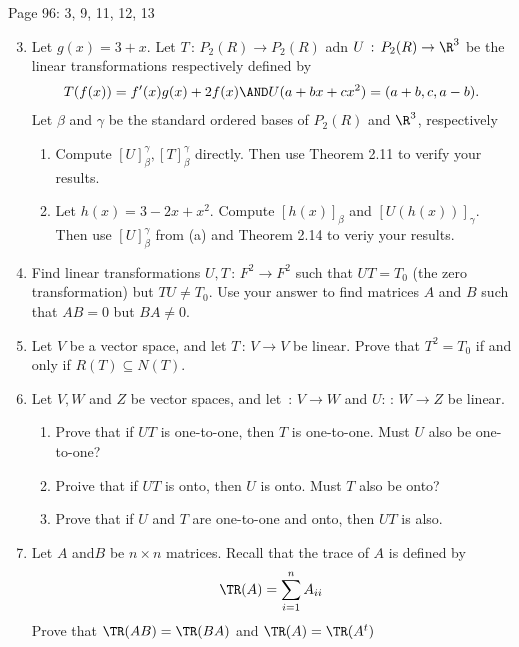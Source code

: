 \documentclass[10pt,a4paper]{report}
\begin{document}
\newpage
Page 96: 3, 9, 11, 12, 13
\begin{enumerate}
	\setcounter{enumi}{2}
	\item Let $g(x)=3+x$.  Let $T\,:\, P_2(R)\to P_2(R)$ adn $U\,:\, P_2(R) \to \R^3$ be the linear transformations respectively defined by 
	\begin{align*}
	T(f(x)) = f'(x)g(x)+2f(x)\AND U(a+bx+cx^2)=(a+b,c,a-b).
	\end{align*}Let $\beta$ and $\gamma$ be the standard ordered bases of $P_2(R)$ and $\R^3$, respectively
	\begin{enumerate}
		\item Compute $[U]_\beta^\gamma, [T]_\beta^\gamma$ directly.  Then use Theorem 2.11 to verify your results.
		\item Let $h(x) =3-2x+x^2$.  Compute $[h(x)]_\beta$ and $[U(h(x))]_\gamma$.  Then use $[U]_\beta^\gamma$ from (a) and Theorem 2.14 to veriy your results.
	\end{enumerate}
	\setcounter{enumi}{8}
	\item Find linear transformations $U,T\,:\,F^2\to F^2$ such that $UT=T_0$ (the zero transformation) but $TU\ne T_0$.  Use your answer to find matrices $A$ and $B$ such that $AB=0$ but $BA \ne 0$.
	\setcounter{enumi}{10}
	\item Let $V$ be a vector space, and let $T\,:\,V\to V$ be linear.  Prove that $T^2=T_0$ if and only if $R(T)\subseteq N(T)$.
	\item Let $V,W$ and $Z$ be vector spaces, and let $\,:\, V\to W$ and $U:\,:\,W \to Z$ be linear.
	\begin{enumerate}
		\item Prove that if $UT$ is one-to-one, then $T$ is one-to-one. Must $U$ also be one-to-one?
		\item Proive that if $UT$ is onto, then $U$ is onto.  Must $T$ also be onto?
		\item Prove that if $U$ and $T$ are one-to-one and onto, then $UT$ is also.
	\end{enumerate}
	\item Let $A$ and$B$ be $n\times n$ matrices.  Recall that the trace of $A$ is defined by 
	\begin{align*}
		\TR(A) = \sum_{i=1}^n A_{ii}
	\end{align*}Prove that $\TR(AB)=\TR(BA)$ and $\TR(A)=\TR(A^t)$
\end{enumerate}
\end{document}
